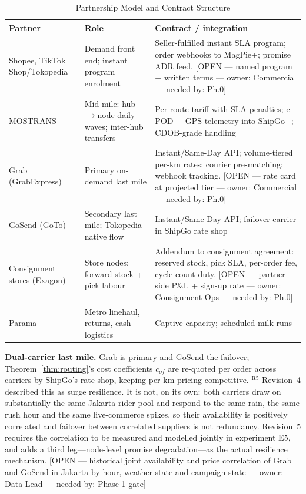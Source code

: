 \documentclass[10pt,twocolumn,letterpaper]{article}
\theoremstyle{definition}
\newcommand{\OPEN}[3]{{\color{openred}\footnotesize\textsf{[OPEN --- #1 --- owner: #2 --- needed by: #3]}}}
\begin{document}
\begin{table}[t]
\caption{Partnership Model and Contract Structure}
\label{tab:partners}
\centering\footnotesize
\begin{tabular}{@{}p{1.7cm}p{2.2cm}p{3.6cm}@{}}
\toprule
\textbf{Partner} & \textbf{Role} & \textbf{Contract / integration}\\
\midrule
Shopee, TikTok Shop/Tokopedia & Demand front end; instant program enrolment & Seller-fulfilled instant SLA program; order webhooks to MagPie+; promise ADR feed. \OPEN{named program + written terms}{Commercial}{Ph.0}\\
MOSTRANS & Mid-mile: hub$\to$node daily waves; inter-hub transfers & Per-route tariff with SLA penalties; e-POD + GPS telemetry into ShipGo+; CDOB-grade handling\\
Grab (GrabExpress) & Primary on-demand last mile & Instant/Same-Day API; volume-tiered per-km rates; courier pre-matching; webhook tracking. \OPEN{rate card at projected tier}{Commercial}{Ph.0}\\
GoSend (GoTo) & Secondary last mile; Tokopedia-native flow & Instant/Same-Day API; failover carrier in ShipGo rate shop\\
Consignment stores (Exagon) & Store nodes: forward stock + pick labour & Addendum to consignment agreement: reserved stock, pick SLA, per-order fee, cycle-count duty. \OPEN{partner-side P\&L + sign-up rate}{Consignment Ops}{Ph.0}\\
Parama & Metro linehaul, returns, cash logistics & Captive capacity; scheduled milk runs\\
\bottomrule
\end{tabular}
\end{table}

\textbf{Dual-carrier last mile.} Grab is primary and GoSend the failover; Theorem~\ref{thm:routing}'s cost coefficients $c_{of}$ are re-quoted per order across carriers by ShipGo's rate shop, keeping per-km pricing competitive. $^{\mathrm{R5}}$ Revision~4 described this as surge resilience. It is not, on its own: both carriers draw on substantially the same Jakarta rider pool and respond to the same rain, the same rush hour and the same live-commerce spikes, so their availability is positively correlated and failover between correlated suppliers is not redundancy. Revision~5 requires the correlation to be measured and modelled jointly in experiment E5, and adds a third leg---node-level promise degradation---as the actual resilience mechanism. \OPEN{historical joint availability and price correlation of Grab and GoSend in Jakarta by hour, weather state and campaign state}{Data Lead}{Phase 1 gate}
\end{document}
